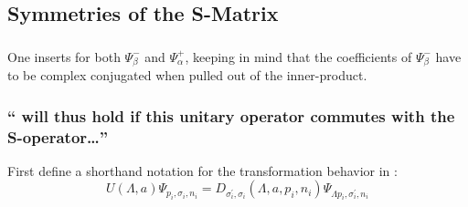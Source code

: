 \subsection{Symmetries of the S-Matrix}\label{susec:3_3}

\subsubsection{ }

One inserts  for both $\Psi_\beta^-$ and $\Psi_\alpha^+$, keeping in mind that the coefficients of  $\Psi_\beta^-$ have to be complex conjugated when pulled out of the inner-product.\newline\newline
{}

\subsubsection{\enquote{ will thus hold if this unitary operator commutes with the S-operator\dots}}\label{sususec:3_3_p118_1}
First define a shorthand notation for the transformation behavior in :
\[U(\Lambda, a )\Psi_{p_i,\sigma_i,n_i}=D_{\sigma_i^\prime,\sigma_i}(\Lambda,a,p_i,n_i)\Psi_{\Lambda p_i,\sigma_i^\prime,n_i}\]


